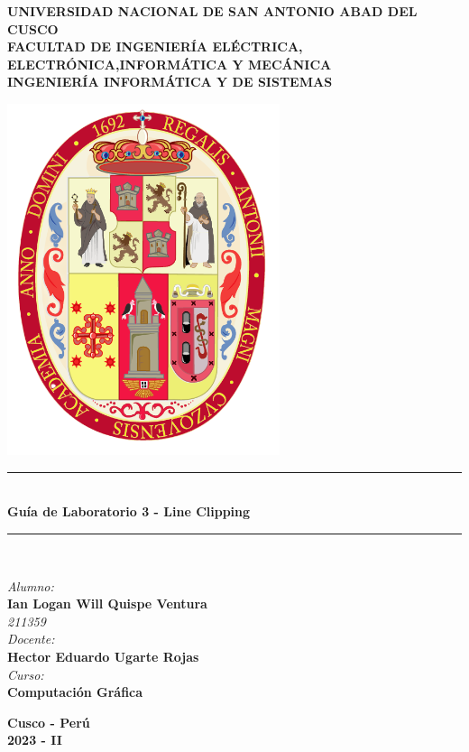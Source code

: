 \documentclass[a4paper]{article}
\begin{document}
\begin{titlepage}

\newcommand{\linea}{\rule{\linewidth}{0.7mm}} 
\center
\textbf{\Large UNIVERSIDAD NACIONAL DE SAN ANTONIO ABAD DEL CUSCO}\\[0.2cm]
\textbf{\Large FACULTAD DE INGENIERÍA ELÉCTRICA, ELECTRÓNICA,INFORMÁTICA Y MECÁNICA}\\[0.2cm]
\textbf{\Large INGENIERÍA INFORMÁTICA Y DE SISTEMAS\\[0.6cm]}

\includegraphics[width=8cm]{src/escudo-unsaac.png}
\vfill

\linea
\\[0.3cm]
\textbf{\LARGE Guía de Laboratorio 3 - Line Clipping}\\[0.2cm]
\linea \\
\vfill

\textit{\Large Alumno:}\\
    \textbf{\large Ian Logan Will Quispe Ventura}\\
    \textit{211359}\\

\vspace{0.3cm}
    \textit{\Large Docente:}\\
    \textbf{\large Hector Eduardo Ugarte Rojas}\\
\vspace{0.5cm}
    \textit{\Large Curso:}\\
    \textbf{\large Computación Gráfica}\\
    \vfill

\vspace{0.4cm}
    \textbf{\Large Cusco - Perú }\\
    \textbf{\large 2023 - II }\\
    \newpage
    \end{titlepage}
\end{document}
